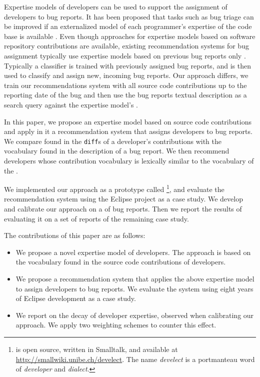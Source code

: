 \documentclass[10pt]{book}
\begin{document}
Expertise models of developers can be used to support the assignment of developers to bug reports. It has been proposed that tasks such as bug triage can be improved if an externalized model of each programmer's expertise of the code base is available \cite{Frit07a}. Even though approaches for expertise models based on software repository contributions are available, existing recommendation systems for bug assignment typically use expertise models based on previous bug reports only \cite{Anvi06a,Canf05a,Cubr04b,Mock02b,Lucc02a}.
Typically a classifier is trained with previously assigned bug reports, and is then used to classify and assign new, incoming bug reports.
Our approach differs, we train our recommendations system with all source code contributions up to the reporting date of the bug and then use the bug reports textual description as a search query against the expertise model's \TAM.

In this paper, we propose an expertise model based on source code contributions and apply in it a recommendation system that assigns developers to bug reports. We compare \VOC found in the \verb$diff$s of a developer's contributions with the vocabulary found in the description of a bug report. We then recommend developers whose contribution vocabulary is lexically similar to the vocabulary of the \BR.

We implemented our approach as a prototype called \TOOL\footnote{\TOOL is open source, written in Smalltalk, and available at \url{http://smallwiki.unibe.ch/develect}. The name \emph{develect} is a portmanteau word of \emph{developer} and \emph{dialect}. }, and evaluate the recommendation system using the Eclipse project as a case study. We develop and calibrate our approach on a \trainingset of bug reports. Then we report the results of evaluating it on a set of reports of the remaining case study.

The contributions of this paper are as follows:
\begin{itemize}
\item We propose a novel expertise model of developers. The approach is based on the vocabulary found in the source code contributions of developers.

\item We propose a recommendation system that applies the above expertise model to assign developers to bug reports. We evaluate the system using eight years of Eclipse development as a case study. 

\item We report on the decay of developer expertise, observed when calibrating our approach. We apply two weighting schemes to counter this effect.
\end{itemize}
\end{document}
